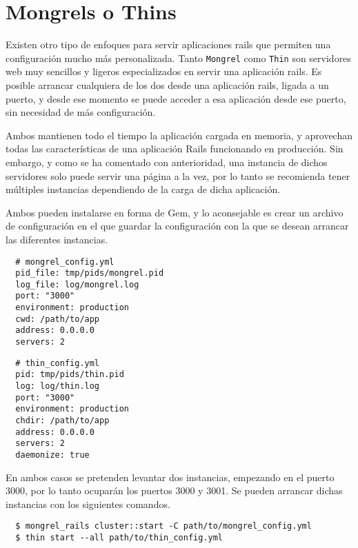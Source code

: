
\section{Mongrels o Thins} %
\label{sub:mongrels_thins}

Existen otro tipo de enfoques para servir aplicaciones rails que permiten una configuración mucho más personalizada. Tanto \texttt{Mongrel} como \texttt{Thin} son servidores web muy sencillos y ligeros especializados en servir una aplicación rails. Es posible arrancar cualquiera de los dos desde una aplicación rails, ligada a un puerto, y desde ese momento se puede acceder a esa aplicación desde ese puerto, sin necesidad de más configuración.

Ambos mantienen todo el tiempo la aplicación cargada en memoria, y aprovechan todas las características de una aplicación Rails funcionando en producción. Sin embargo, y como se ha comentado con anterioridad, una instancia de dichos servidores solo puede servir una página a la vez, por lo tanto se recomienda tener múltiples instancias dependiendo de la carga de dicha aplicación.

Ambos pueden instalarse en forma de Gem, y lo aconsejable es crear un archivo de configuración en el que guardar la configuración con la que se desean arrancar las diferentes instancias.

\begin{verbatim}
  # mongrel_config.yml
  pid_file: tmp/pids/mongrel.pid
  log_file: log/mongrel.log
  port: "3000"
  environment: production
  cwd: /path/to/app
  address: 0.0.0.0
  servers: 2
\end{verbatim}

\begin{verbatim}
  # thin_config.yml
  pid: tmp/pids/thin.pid
  log: log/thin.log
  port: "3000"
  environment: production
  chdir: /path/to/app
  address: 0.0.0.0
  servers: 2
  daemonize: true
\end{verbatim}

En ambos casos se pretenden levantar dos instancias, empezando en el puerto 3000, por lo tanto ocuparán los puertos 3000 y 3001. Se pueden arrancar dichas instancias con los siguientes comandos.

\begin{verbatim}
  $ mongrel_rails cluster::start -C path/to/mongrel_config.yml
  $ thin start --all path/to/thin_config.yml
\end{verbatim}

